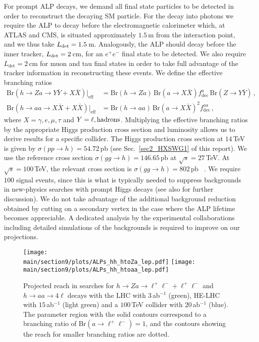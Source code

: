 For prompt ALP decays, we demand all final state particles to be detected in order to reconstruct the decaying SM particle. For the decay into photons we 
require the ALP to decay before the electromagnetic calorimeter which, at ATLAS and CMS, is situated approximately $1.5\,$m from the interaction point, and we thus take $L_{\rm det} = 
1.5\,$m. Analogously, the ALP should decay before the inner tracker, $L_{\rm det} = 2\,$cm, for an $e^+e^-$ final state to be detected. We also require $L_\text{det}
=2\,$cm for muon and tau final states in order to take full advantage of the tracker information in reconstructing these events. We define the effective branching ratios
%
\begin{align}
\text{Br}(h\to Za\to Y\bar{Y}+X\bar{X})\big\vert_\text{eff}&=\text{Br}(h\to Za)\,\text{Br}(a\to X\bar{X})f_\text{dec}^a\,\text{Br}(Z\to Y\bar{Y})\,,\label{eq:LHChZa}\\
\text{Br}(h\to aa\to X\bar{X}+X\bar{X})\big\vert_\text{eff}&=\text{Br}(h\to aa)\,\text{Br}(a\to X\bar{X})^2f_\text{dec}^{aa}\,,\label{eq:LHChaa}
\end{align}
%
where $X=\gamma, e, \mu, \tau$ and $Y=\ell, {\rm hadrons}$. Multiplying the effective branching ratios by the appropriate Higgs production cross section and luminosity allows us to derive results for a specific collider. The Higgs production cross section at $14\,$TeV is given by $\sigma(pp\to h)= 54.72\,$pb (see Sec.~\ref{sec2_HXSWG1} of this report). We use the reference cross section $\sigma(gg 
\to h) = 146.65\,$pb at $\sqrt{s} = 27\,$TeV. At $\sqrt{s} = 100\,$TeV, the relevant cross section is $\sigma(gg \to h) = 802\,$pb ~\cite{Mangano:2016jyj}. We require $100$ signal events, since this is what is typically needed to suppress backgrounds in new-physics searches with prompt Higgs decays \cite{Khachatryan:2016vau, Chatrchyan:2013vaa,Aad:2015bua} (see also \cite{Bauer:2017ris} for 
further discussion).
We do not take advantage of the additional background reduction obtained by cutting on a secondary vertex in the case where the ALP lifetime becomes appreciable. A dedicated analysis by the experimental collaborations including detailed simulations of the backgrounds is required to improve on our projections.  


%
\begin{figure}[t]
\begin{center}
\texttt{[image: \\main/section9/plots/ALPs\_hh\_htoZa\_lep.pdf]}
\texttt{[image: \\main/section9/plots/ALPs\_hh\_htoaa\_lep.pdf]}
\end{center}
\vspace{-3mm}
\caption{\label{fig:pphZalep} Projected reach in searches for $h \to Za \to \ell^+\ell^-+\ell^+\ell^- $ and $h \to aa \to 4\ell $ decays with the LHC with $3$\,ab$^{-1}$
(green), HE-LHC with $15$\,ab$^{-1}$ (light green) and a $100\,$TeV collider with $20$\,ab$^{-1}$ (blue). The parameter region with the solid contours correspond to a branching ratio of $\text{Br}(a\to 
\ell^+\ell^-)=1$, and the contours showing the reach for smaller branching ratios are dotted.}
\end{figure}
%

